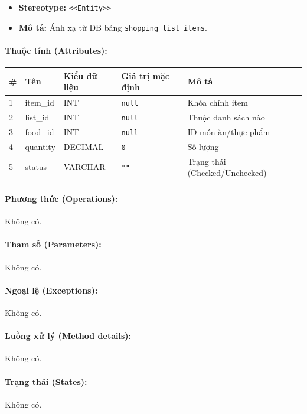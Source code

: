\documentclass[12pt,a4paper]{article}
\begin{document}
\begin{itemize}[leftmargin=*]
    \item \textbf{Stereotype:} \texttt{\textless{}\textless{}Entity\textgreater{}\textgreater{}}
    \item \textbf{Mô tả:} Ánh xạ từ DB bảng \texttt{shopping\_list\_items}.
\end{itemize}

\paragraph{Thuộc tính (Attributes):}
\begin{longtable}{|p{0.6cm}|p{3.5cm}|p{2.4cm}|p{1.8cm}|p{5.1cm}|}
\hline
\textbf{\#} & \textbf{Tên} & \textbf{Kiểu dữ liệu} & \textbf{Giá trị mặc định} & \textbf{Mô tả} \\ \hline
\endhead
1 & item\_id & INT & \texttt{null} & Khóa chính item \\ \hline
2 & list\_id & INT & \texttt{null} & Thuộc danh sách nào \\ \hline
3 & food\_id & INT & \texttt{null} & ID món ăn/thực phẩm \\ \hline
4 & quantity & DECIMAL & \texttt{0} & Số lượng \\ \hline
5 & status & VARCHAR & \texttt{""} & Trạng thái (Checked/Unchecked) \\ \hline
\end{longtable}

\paragraph{Phương thức (Operations):}
Không có.

\paragraph{Tham số (Parameters):}
Không có.

\paragraph{Ngoại lệ (Exceptions):}
Không có.

\paragraph{Luồng xử lý (Method details):}
Không có.

\paragraph{Trạng thái (States):}
Không có.
\end{document}
